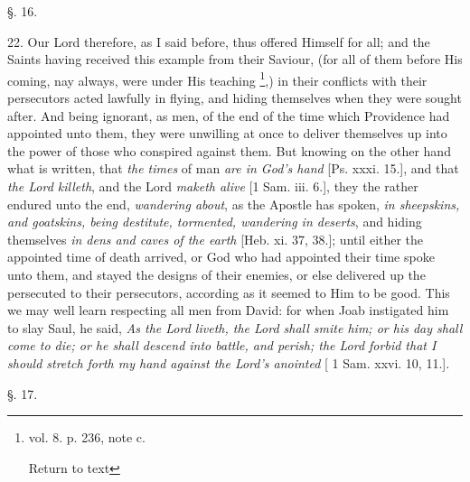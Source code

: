 §. 16.

22. Our Lord therefore, as I said before, thus
offered Himself for all; and the Saints having received this example
from their Saviour, (for all of them before His coming, nay always,
were under His teaching \footnote{vol. 8. p. 236, note c.

Return to text},) in their
conflicts with their persecutors acted lawfully in flying, and hiding
themselves when they were sought after. And being ignorant, as men, of
the end of the time which Providence had appointed unto them,
they were unwilling at once to deliver themselves up into the power of
those who conspired against them. But knowing on the other hand what
is written, that \emph{the times} of man \emph{are in God's hand}
[Ps. xxxi. 15.], and that \emph{the Lord killeth}, and the Lord \emph{maketh
alive} [1 Sam. iii. 6.], they the rather endured unto the end, \emph{wandering
about}, as the Apostle has spoken, \emph{in sheepskins, and goatskins,
being destitute, tormented, wandering in deserts}, and hiding
themselves \emph{in dens and caves of the earth} [Heb. xi. 37, 38.];
until either the appointed time of death arrived, or God who had
appointed their time spoke unto them, and stayed the designs of their
enemies, or else delivered up the persecuted to their persecutors,
according as it seemed to Him to be good. This we may well learn
respecting all men from David: for when Joab instigated him to slay
Saul, he said, \emph{As the Lord liveth, the Lord shall smite him; or his
day shall come to die; or he shall descend into battle, and perish;
the Lord forbid that I should stretch forth my hand against the
Lord's anointed} [ 1 Sam. xxvi. 10, 11.].

§. 17.

